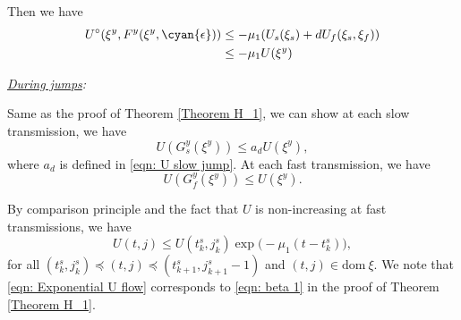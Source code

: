 Then we have 
\begin{equation}
    \begin{aligned}
        U^\circ(\xi^y, F^y(\xi^y, \cyan{\epsilon})) &\leq -\mu_1 (U_s(\xi_s) + d U_f(\xi_s,\xi_f)) \\
        & \leq - \mu_1 U(\xi^y)
    \end{aligned}
\end{equation}


\noindent\emph{\underline{During jumps}:} 

Same as the proof of Theorem \ref{Theorem H_1}, we can show at each slow transmission, we have
\begin{equation}
    U(G_s^y(\xi^y)) \leq a_d U(\xi^y),
    \label{eqn: Exponential U slow jump}
\end{equation}
where $a_d$ is defined in \eqref{eqn: U slow jump}. At each fast transmission, we have 
\begin{equation*}
    U(G_f^y(\xi^y)) \leq U(\xi^y).
\end{equation*}



By comparison principle \cite[Lemma 3.4]{nonlinear_systems_Khalil} and the fact that $U$ is non-increasing at fast transmissions, we have
\begin{equation}
    U(t,j) \leq U(t_k^s, j_k^s) \exp \! \big(-\mu_1(t-t_k^s) \big) \label{eqn: Exponential U flow}, 
\end{equation}
for all $(t_k^s, j_k^s) \preceq (t,j) \preceq (t_{k+1}^s, j_{k+1}^s - 1)$ and $(t,j)\in \text{dom}\ \xi$. We note that \eqref{eqn: Exponential U flow} corresponds to \eqref{eqn: beta 1} in the proof of Theorem \ref{Theorem H_1}.






